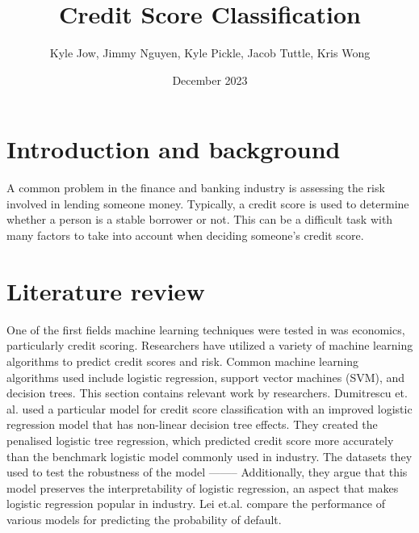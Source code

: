 \documentclass{article}
\title{\textbf{Credit Score Classification}}
\author{Kyle Jow, Jimmy Nguyen, Kyle Pickle, Jacob Tuttle, Kris Wong}
\date{December 2023}
\begin{document}
\maketitle
\newpage
{}
\pagestyle{fancy}
\fancyhf{} %
\fancyfoot[R]{\thepage}
\section*{Introduction and background}
A common problem in the finance and banking industry is assessing the risk
involved in lending someone money. Typically, a credit score is used to determine
whether a person is a stable borrower or not. This can be a difficult task with
many factors to take into account when deciding someone's credit score.
\section*{Literature review}
One of the first fields machine learning techniques were tested in was economics,
particularly credit scoring. Researchers have utilized a variety of machine learning
algorithms to predict credit scores and risk. Common machine learning algorithms
used include logistic regression, support vector machines (SVM), and decision trees.
This section contains relevant work by researchers.
\vspace{5mm}\newline
Dumitrescu et. al. used a particular model for credit score classification with an 
improved logistic regression model that has non-linear decision tree effects. They created 
the penalised logistic tree regression, which predicted credit score 
more accurately than the benchmark logistic model commonly used in industry. The
datasets they used to test the robustness of the model --------
Additionally, they argue that this model preserves the interpretability of 
logistic regression, an aspect that makes logistic regression popular in industry. 
Lei et.al. compare the performance of various models for predicting the probability 
of default. 

\newpage
\end{document}
